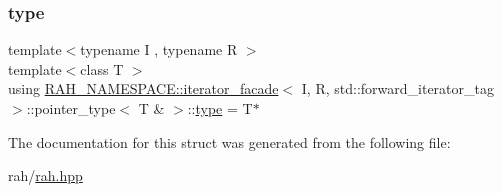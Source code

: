\subsubsection{\texorpdfstring{type}{type}}
{\footnotesize\ttfamily template$<$typename I , typename R $>$ \\
template$<$class T $>$ \\
using \mbox{\hyperlink{struct_r_a_h___n_a_m_e_s_p_a_c_e_1_1iterator__facade}{R\+A\+H\+\_\+\+N\+A\+M\+E\+S\+P\+A\+C\+E\+::iterator\+\_\+facade}}$<$ I, R, std\+::forward\+\_\+iterator\+\_\+tag $>$\+::pointer\+\_\+type$<$ T \& $>$\+::\mbox{\hyperlink{struct_r_a_h___n_a_m_e_s_p_a_c_e_1_1iterator__facade_3_01_i_00_01_r_00_01std_1_1forward__iteratoea928274de843ca75854fe11c7a3d72e_ae22b60421f07225c791125987b870d8f}{type}} =  T$\ast$}



The documentation for this struct was generated from the following file\+:\begin{DoxyCompactItemize}
\item 
rah/\mbox{\hyperlink{rah_8hpp}{rah.\+hpp}}\end{DoxyCompactItemize}
